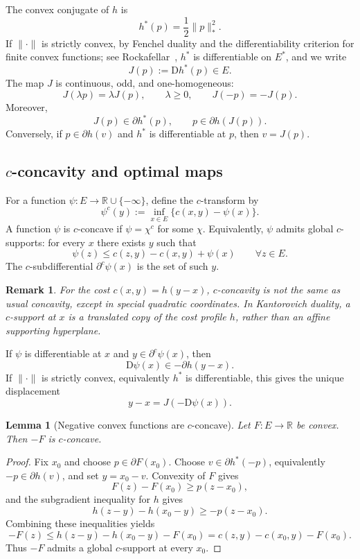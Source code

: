 \documentclass[10pt,a4paper]{amsart}
\numberwithin{equation}{section}
\newtheorem{lemma}[theorem]{Lemma}
\newtheorem{remark}[theorem]{Remark}
\newcommand{\R}{\mathbb{R}}
\newcommand{\D}{\mathrm D}
\begin{document}
	The convex conjugate of $h$ is
	\[
	h^*(p)=\frac12\|p\|_*^2.
	\]
	If $\|\cdot\|$ is strictly convex, by Fenchel duality and the differentiability criterion for finite convex functions; see Rockafellar~\cite[Theorems 23.5 and 25.1]{Rockafellar1970}, $h^*$ is differentiable on $E^*$, and we write
	\[
	J(p):=\D h^*(p)\in E.
	\]
	The map $J$ is continuous, odd, and one-homogeneous:
	\[
	J(\lambda p)=\lambda J(p),\qquad \lambda\ge0,
	\qquad J(-p)=-J(p).
	\]
	Moreover,
	\[
	J(p)\in\partial h^*(p),
	\qquad p\in\partial h(J(p)).
	\]
	Conversely, if $p\in\partial h(v)$ and $h^*$ is differentiable at $p$, then $v=J(p)$.
	
	\subsection{$c$-concavity and optimal maps}\label{subsec:c-concavity}
	
	For a function $\psi:E\to\R\cup\{-\infty\}$, define the $c$-transform by
	\[
	\psi^c(y):=\inf_{x\in E}\{c(x,y)-\psi(x)\}.
	\]
	A function $\psi$ is $c$-concave if $\psi=\chi^c$ for some $\chi$. Equivalently, $\psi$ admits global $c$-supports: for every $x$ there exists $y$ such that
	\[
	\psi(z)\le c(z,y)-c(x,y)+\psi(x)
	\qquad\forall z\in E.
	\]
	The $c$-subdifferential $\partial^c\psi(x)$ is the set of such $y$.
	
	\begin{remark}
		For the cost $c(x,y)=h(y-x)$, $c$-concavity is not the same as usual concavity, except in special quadratic coordinates. In Kantorovich duality, a $c$-support at $x$ is a translated copy of the cost profile $h$, rather than an affine supporting hyperplane.
	\end{remark}
	
	If $\psi$ is differentiable at $x$ and $y\in\partial^c\psi(x)$, then
	\[
	\D\psi(x)\in -\partial h(y-x).
	\]
	If $\|\cdot\|$ is strictly convex, equivalently $h^*$ is differentiable, this gives the unique displacement
	\[
	y-x=J(-\D\psi(x)).
	\]
	
	\begin{lemma}[Negative convex functions are $c$-concave]
		\label{lem:negative-convex}
		Let $F:E\to\R$ be convex. Then $-F$ is $c$-concave.
	\end{lemma}
	
	\begin{proof}
		Fix $x_0$ and choose $p\in\partial F(x_0)$. Choose $v\in\partial h^*(-p)$, equivalently $-p\in\partial h(v)$, and set $y=x_0-v$. Convexity of $F$ gives
		\[
		F(z)-F(x_0)\ge p(z-x_0),
		\]
		and the subgradient inequality for $h$ gives
		\[
		h(z-y)-h(x_0-y)\ge -p(z-x_0).
		\]
		Combining these inequalities yields
		\[
		-F(z)\le h(z-y)-h(x_0-y)-F(x_0)
		=c(z,y)-c(x_0,y)-F(x_0).
		\]
		Thus $-F$ admits a global $c$-support at every $x_0$.
	\end{proof}
	
\end{document}

